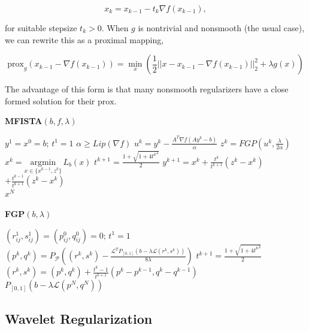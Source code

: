 \documentclass[10pt,a4paper]{article}
\newcommand{\prox}{\mathrm{prox}}
\begin{document}
\begin{equation}
x_k = x_{k-1} - t_k \nabla f(x_{k-1}),
\end{equation}

for suitable stepsize $t_k > 0$. When $g$ is nontrivial and nonsmooth (the usual case), we can rewrite this as a proximal mapping,

\begin{equation}
\prox_g(x_{k-1} - \nabla f(x_{k-1})) = \min_x \left( \frac{1}{2}||x-x_{k-1} - \nabla f(x_{k-1})||_2^2  + \lambda g(x)\right)
\end{equation}

The advantage of this form is that many nonsmooth regularizers have a close formed solution for their $\prox$.


\begin{minipage}{0.48\textwidth}
\textbf{MFISTA$(b,f, \lambda)$}
\begin{algorithmic}
\State $y^1 = x^0 = b; \, t^1 = 1$
\State $\alpha \geq Lip(\nabla f)$
	\State $u^k = y^k - \frac{A^T\nabla f (A y^k - b)}{\alpha}$
	\State $z^k = FGP(u^k, \frac{\lambda}{2 \alpha})$
	\State $x^k = \underset{x \in \{x^{k-1},z^k\}}{\text{argmin}} \,L_b(x)$
	\State $t^{k+1} = \frac{1 + \sqrt{1 + 4{t^k}^2}}{2}$ 
	\State $y^{k+1} = x^k + \frac{t^k}{t^{k+1}}(z^k - x^k)$ 
	\State \hspace{10 mm}$+ \frac{t^{k-1}}{t^{k+1}}(z^k - x^k) $
\EndFor\\
\Return $x^N$
\end{algorithmic}
\end{minipage}
\begin{minipage}{0.48\textwidth}

\textbf{FGP$(b, \lambda)$}
\begin{algorithmic}
\State $(r_{ij}^1, s_{ij}^1) = (p_{ij}^0, q_{ij}^0) = 0; \, t^1 = 1$
	\State $(p^k,q^k) = P_\mathcal{P} \left( (r^k,s^k) - \frac{\mathcal{L}^TP_{[0,1]} (b - \lambda \mathcal{L}(r^k,s^k))}{8\lambda} \right)$
	\State $t^{k+1} = \frac{1 + \sqrt{1 + 4{t^k}^2}}{2}$ 
	\State $(r^k,s^k) = (p^k,q^k) + \frac{t^k-1}{t^{k+1}}(p^k-p^{k-1}, q^k-q^{k-1})$ 
\EndFor \\
\Return $P_{[0,1]} (b - \lambda \mathcal{L}(p^N,q^N))$
\end{algorithmic}

\end{minipage}

\subsection{Wavelet Regularization}
\end{document}
